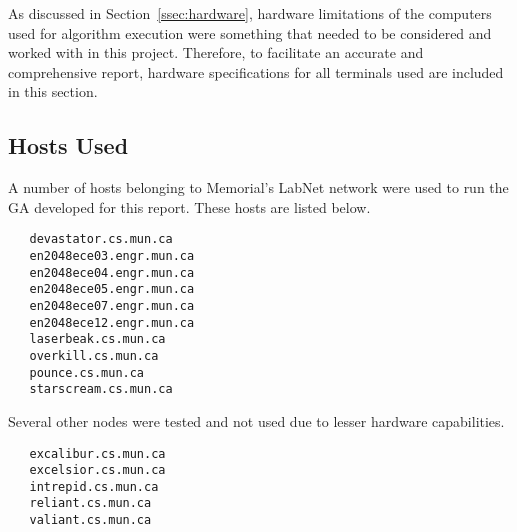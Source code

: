 \raggedbottom
As discussed in Section~\ref{ssec:hardware}, hardware limitations of the
computers used for algorithm execution were something that needed
to be considered and worked with in this project. Therefore, to 
facilitate an accurate and comprehensive report, hardware specifications
for all terminals used are included in this section. 


\subsection{Hosts Used}
A number of hosts belonging to Memorial's LabNet network were used to
run the GA developed for this report. These hosts are listed below.

\begin{verbatim}
   devastator.cs.mun.ca
   en2048ece03.engr.mun.ca
   en2048ece04.engr.mun.ca
   en2048ece05.engr.mun.ca
   en2048ece07.engr.mun.ca
   en2048ece12.engr.mun.ca
   laserbeak.cs.mun.ca
   overkill.cs.mun.ca
   pounce.cs.mun.ca
   starscream.cs.mun.ca
\end{verbatim}
Several other nodes were tested and not used due to lesser hardware 
capabilities.
\begin{verbatim}
   excalibur.cs.mun.ca
   excelsior.cs.mun.ca
   intrepid.cs.mun.ca
   reliant.cs.mun.ca
   valiant.cs.mun.ca
\end{verbatim}

